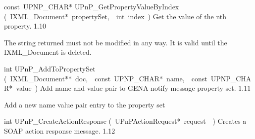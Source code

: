 \documentclass{article}
\begin{document}
\begin{cxxentry}
\begin{cxxfunction}
\begin{cxxdoc}
\end{cxxdoc}
\end{cxxfunction}
\begin{cxxfunction}
{const\ UPNP\_CHAR*}
        {UPnP\_GetPropertyValueByIndex}
        {(\ IXML\_Document*\ propertySet,\ \ int\ index\ )}
        {Get the value of the nth property. }
        {1.10}
\begin{cxxdoc}

The string returned must not be modified in any way.  It is valid until
the IXML\_Document is deleted.


\end{cxxdoc}
\end{cxxfunction}
\begin{cxxfunction}
{int}
        {UPnP\_AddToPropertySet}
        {(\ IXML\_Document**\ doc,\ \ const\ UPNP\_CHAR*\ name,\ \ const\ UPNP\_CHAR*\ value\ )}
        {Add name and value pair to GENA notify message property set. }
        {1.11}
\begin{cxxdoc}

Add a new name value pair entry to the property set


\end{cxxdoc}
\end{cxxfunction}
\begin{cxxfunction}
{int}
        {UPnP\_CreateActionResponse}
        {(\ UPnPActionRequest*\ request\ \ )}
        {Creates a SOAP action response message. }
        {1.12}
\begin{cxxdoc}


\end{cxxdoc}
\end{cxxfunction}
\end{cxxentry}
\end{document}
